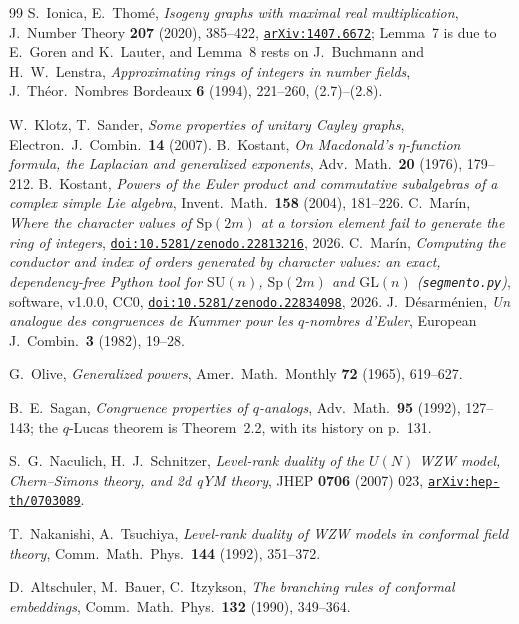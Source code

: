 \documentclass[11pt,a4paper]{article}
\theoremstyle{definition}
\newcommand{\Sp}{\mathrm{Sp}}
\newcommand{\SU}{\mathrm{SU}}
\newcommand{\GL}{\mathrm{GL}}
\begin{document}
\begin{thebibliography}{99}
 S.~Ionica, E.~Thom\'e, \emph{Isogeny graphs with maximal real multiplication},
J.~Number Theory \textbf{207} (2020), 385--422,
\href{https://arxiv.org/abs/1407.6672}{\texttt{arXiv:1407.6672}}; Lemma~7 is due to E.~Goren and
K.~Lauter, and Lemma~8 rests on J.~Buchmann and H.~W.~Lenstra, \emph{Approximating rings of
integers in number fields}, J.~Th\'eor.~Nombres Bordeaux \textbf{6} (1994), 221--260, (2.7)--(2.8).

 W.~Klotz, T.~Sander, \emph{Some properties of unitary Cayley graphs},
Electron.~J.~Combin.~\textbf{14} (2007).
 B.~Kostant, \emph{On Macdonald's $\eta$-function formula, the Laplacian and
generalized exponents}, Adv.~Math.~\textbf{20} (1976), 179--212.
 B.~Kostant, \emph{Powers of the Euler product and commutative subalgebras of a
complex simple Lie algebra}, Invent.~Math.~\textbf{158} (2004), 181--226.
 C.~Mar\'in, \emph{Where the character values of $\Sp(2m)$ at a torsion element fail
to generate the ring of integers}, \href{https://doi.org/10.5281/zenodo.22813216}{\texttt{doi:10.5281/zenodo.22813216}}, 2026.
 C.~Mar\'in, \emph{Computing the conductor and index of orders generated by
character values: an exact, dependency-free Python tool for $\SU(n)$, $\Sp(2m)$ and $\GL(n)$
(\texttt{segmento.py})}, software, v1.0.0, CC0,
\href{https://doi.org/10.5281/zenodo.22834098}{\texttt{doi:10.5281/zenodo.22834098}}, 2026.
 J.~D\'esarm\'enien, \emph{Un analogue des congruences de Kummer pour les
$q$-nombres d'Euler}, European J.~Combin.~\textbf{3} (1982), 19--28.

 G.~Olive, \emph{Generalized powers}, Amer.~Math.~Monthly \textbf{72} (1965),
619--627.

 B.~E.~Sagan, \emph{Congruence properties of $q$-analogs}, Adv.~Math.~\textbf{95}
(1992), 127--143; the $q$-Lucas theorem is Theorem~2.2, with its history on p.~131.

 S.~G.~Naculich, H.~J.~Schnitzer, \emph{Level-rank duality of the $U(N)$ WZW model,
Chern--Simons theory, and 2d qYM theory}, JHEP \textbf{0706} (2007) 023,
\href{https://arxiv.org/abs/hep-th/0703089}{\texttt{arXiv:hep-th/0703089}}.

 T.~Nakanishi, A.~Tsuchiya, \emph{Level-rank duality of WZW models in conformal field
theory}, Comm.~Math.~Phys.~\textbf{144} (1992), 351--372.

 D.~Altschuler, M.~Bauer, C.~Itzykson, \emph{The branching rules of conformal
embeddings}, Comm.~Math.~Phys.~\textbf{132} (1990), 349--364.


\end{thebibliography}
\end{document}
